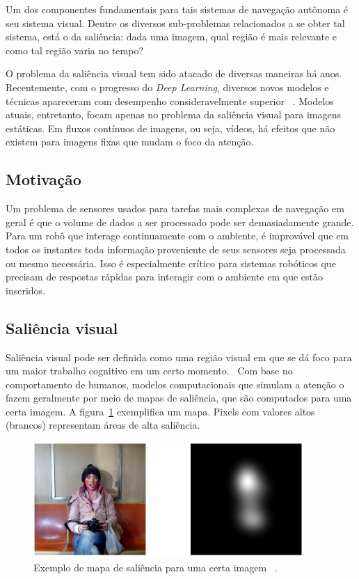 \documentclass[11pt]{article}
\newcommand{\tit}[1]{\textit{#1}}
\begin{document}
Um dos componentes fundamentais para tais sistemas de navegação autônoma é seu
sistema visual.
Dentre os diversos sub-problemas relacionados a se obter
tal sistema, está o da saliência: dada uma imagem, qual região é mais
relevante e como tal região varia no tempo?

O problema da saliência visual tem sido atacado de diversas maneiras há anos.
Recentemente, com o progresso do \tit{Deep Learning}, diversos novos modelos
e técnicas apareceram com desempenho consideravelmente superior
~\cite{ref:mit300-bm}.
Modelos atuais, entretanto, focam apenas no problema da saliência visual
para imagens estáticas.
Em fluxos contínuos de imagens, ou seja, vídeos, há efeitos que não existem
para imagens fixas que mudam o foco da atenção.

\subsection{Motivação}
Um problema de sensores usados para tarefas mais complexas de navegação
em geral
é que o volume de dados a ser processado pode ser demasiadamente grande.
Para um robô que interage continuamente com o ambiente, é improvável que em
todos os instantes  toda informação proveniente de seus sensores seja
processada ou mesmo necessária.
Isso é especialmente crítico para sistemas robóticos que precisam de respostas
rápidas para interagir com o ambiente em que estão inseridos.

\subsection{Saliência visual}
Saliência visual pode ser definida como uma região visual em que se dá
foco para um maior trabalho cognitivo em um certo momento.~\cite{ref:fit}
Com base no comportamento de humanos, modelos computacionais que simulam
a atenção o fazem geralmente por meio de mapas de saliência, que são
computados para uma certa imagem.
A figura~\ref{fig:sal-map} exemplifica um mapa.
Pixels com valores altos (brancos) representam áreas de alta saliência.

\begin{figure}[H]
    \centering
    \includegraphics[width=0.6\linewidth]{imgs/sal_map_1.png}
    \caption{Exemplo de mapa de saliência para uma certa imagem
    ~\cite{ref:salicon}.}
    \label{fig:sal-map}
\end{figure}
\end{document}
